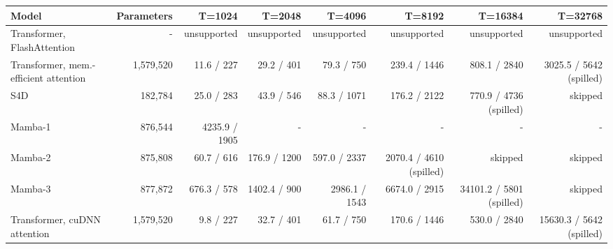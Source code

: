 \begin{tabular}{lrrrrrrr}
\toprule
Model & Parameters & T=1024 & T=2048 & T=4096 & T=8192 & T=16384 & T=32768 \\
\midrule
Transformer, FlashAttention & - & unsupported & unsupported & unsupported & unsupported & unsupported & unsupported \\
Transformer, mem.-efficient attention & 1,579,520 & 11.6 / 227 & 29.2 / 401 & 79.3 / 750 & 239.4 / 1446 & 808.1 / 2840 & 3025.5 / 5642 (spilled) \\
S4D & 182,784 & 25.0 / 283 & 43.9 / 546 & 88.3 / 1071 & 176.2 / 2122 & 770.9 / 4736 (spilled) & skipped \\
Mamba-1 & 876,544 & 4235.9 / 1905 & - & - & - & - & - \\
Mamba-2 & 875,808 & 60.7 / 616 & 176.9 / 1200 & 597.0 / 2337 & 2070.4 / 4610 (spilled) & skipped & skipped \\
Mamba-3 & 877,872 & 676.3 / 578 & 1402.4 / 900 & 2986.1 / 1543 & 6674.0 / 2915 & 34101.2 / 5801 (spilled) & skipped \\
Transformer, cuDNN attention & 1,579,520 & 9.8 / 227 & 32.7 / 401 & 61.7 / 750 & 170.6 / 1446 & 530.0 / 2840 & 15630.3 / 5642 (spilled) \\
\bottomrule
\end{tabular}
\par{}
